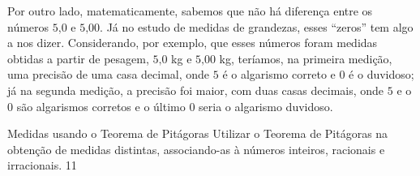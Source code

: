 Por outro lado, matematicamente, sabemos que não há diferença entre os números $5\text{,}0$ e $5\text{,}00$. Já no estudo de medidas de grandezas, esses “zeros” tem algo a nos dizer. Considerando, por exemplo, que esses números foram medidas obtidas a partir de pesagem, $5\text{,}0$ kg  e $5\text{,}00$ kg, teríamos, na primeira medição, uma precisão de uma casa decimal, onde $5$ é o algarismo correto e $0$ é o duvidoso; já na segunda medição, a precisão foi maior, com duas casas decimais, onde $5$ e o $0$ são algarismos corretos e o último $0$ seria o algarismo duvidoso.

\clearpage
\begin{objectives}{Medidas usando o Teorema de Pitágoras}
{
Utilizar o Teorema de Pitágoras na obtenção de medidas distintas, associando-as à números inteiros, racionais e irracionais.
}{1}{1}
\end{objectives}
